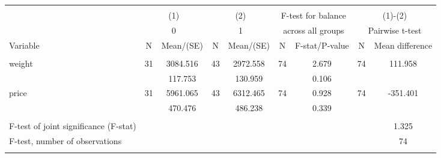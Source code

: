 \begin{tabular}{@{\extracolsep{5pt}}lcccccccc}
\\[-1.8ex]\hline \hline \\[-1.8ex]
 & \multicolumn{2}{c}{(1)}  & \multicolumn{2}{c}{(2)}  & \multicolumn{2}{c}{F-test for balance} & \multicolumn{2}{c}{(1)-(2)} \\
 & \multicolumn{2}{c}{0}  & \multicolumn{2}{c}{1}  & \multicolumn{2}{c}{across all groups} & \multicolumn{2}{c}{Pairwise t-test}  \\
Variable & N & Mean/(SE) & N & Mean/(SE) & N & F-stat/P-value & N & Mean difference \\ \hline \\[-1.8ex] 
weight   & 31    &  3084.516    & 43    &  2972.558    & 74    &     2.679    & 74    &   111.958   \\
 &   &   117.753  &   &   130.959  &   &     0.106  &   &   \\
price   & 31    &  5961.065    & 43    &  6312.465    & 74    &     0.928    & 74    &  -351.401   \\
 &   &   470.476  &   &   486.238  &   &     0.339  &   &   \\
\hline \\[-1.8ex]
F-test of joint significance (F-stat) & &   & &   & &     & &      1.325   \\
F-test, number of observations & &   & &   & &   & &  74   \\
\hline \\[-1.8ex]

\end{tabular}

